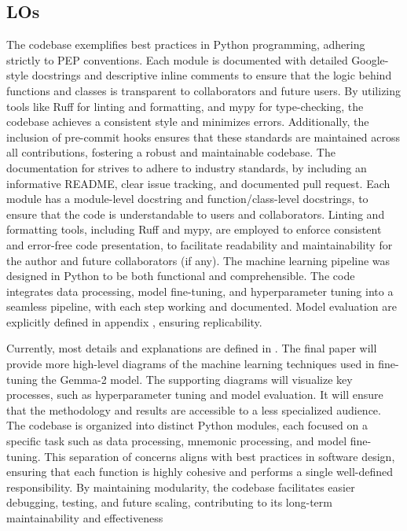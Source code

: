 \subsection{LOs} \label{sec:los}
 The codebase exemplifies best practices in Python programming, adhering strictly to PEP conventions. Each module is documented with detailed Google-style docstrings and descriptive inline comments to ensure that the logic behind functions and classes is transparent to collaborators and future users. By utilizing tools like Ruff for linting and formatting, and mypy for type-checking, the codebase achieves a consistent style and minimizes errors. Additionally, the inclusion of pre-commit hooks ensures that these standards are maintained across all contributions, fostering a robust and maintainable codebase.
 The documentation for strives to adhere to industry standards, by including an informative README, clear issue tracking, and documented pull request. Each module has a module-level docstring and function/class-level docstrings, to ensure that the code is understandable to users and collaborators. Linting and formatting tools, including Ruff and mypy, are employed to enforce consistent and error-free code presentation, to facilitate readability and maintainability for the author and future collaborators (if any).
 The machine learning pipeline was designed in Python to be both functional and comprehensible. The code integrates data processing, model fine-tuning, and hyperparameter tuning into a seamless pipeline, with each step working and documented. Model evaluation are explicitly defined in appendix , ensuring replicability.

 Currently, most details and explanations are defined in . The final paper will provide more high-level diagrams of the machine learning techniques used in fine-tuning the Gemma-2 model. The supporting diagrams will visualize key processes, such as hyperparameter tuning and model evaluation. It will ensure that the methodology and results are accessible to a less specialized audience.
 The codebase is organized into distinct Python modules, each focused on a specific task such as data processing, mnemonic processing, and model fine-tuning. This separation of concerns aligns with best practices in software design, ensuring that each function is highly cohesive and performs a single well-defined responsibility. By maintaining modularity, the codebase facilitates easier debugging, testing, and future scaling, contributing to its long-term maintainability and effectiveness

